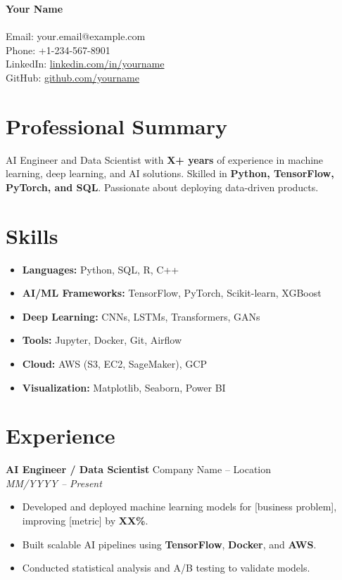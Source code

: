 \documentclass[a4paper,10pt]{article}
\begin{document}
\begin{center}
    {\LARGE \textbf{Your Name}} \\
    [Your City, Country] \\
    Email: your.email@example.com \\
    Phone: +1-234-567-8901 \\
    LinkedIn: \href{https://linkedin.com/in/yourname}{linkedin.com/in/yourname} \\
    GitHub: \href{https://github.com/yourname}{github.com/yourname} \\
\end{center}

\vspace{0.3cm}

\section*{Professional Summary}
AI Engineer and Data Scientist with \textbf{X+ years} of experience in machine learning, deep learning, and AI solutions. Skilled in \textbf{Python, TensorFlow, PyTorch, and SQL}. Passionate about deploying data-driven products.

\section*{Skills}
\begin{itemize}[leftmargin=*, noitemsep]
    \item \textbf{Languages:} Python, SQL, R, C++
    \item \textbf{AI/ML Frameworks:} TensorFlow, PyTorch, Scikit-learn, XGBoost
    \item \textbf{Deep Learning:} CNNs, LSTMs, Transformers, GANs
    \item \textbf{Tools:} Jupyter, Docker, Git, Airflow
    \item \textbf{Cloud:} AWS (S3, EC2, SageMaker), GCP
    \item \textbf{Visualization:} Matplotlib, Seaborn, Power BI
\end{itemize}

\section*{Experience}

\textbf{AI Engineer / Data Scientist} \hfill Company Name -- Location \\
\textit{MM/YYYY -- Present}
\begin{itemize}[leftmargin=*, noitemsep]
    \item Developed and deployed machine learning models for [business problem], improving [metric] by \textbf{XX\%}.
    \item Built scalable AI pipelines using \textbf{TensorFlow}, \textbf{Docker}, and \textbf{AWS}.
    \item Conducted statistical analysis and A/B testing to validate models.
\end{itemize}
\end{document}
